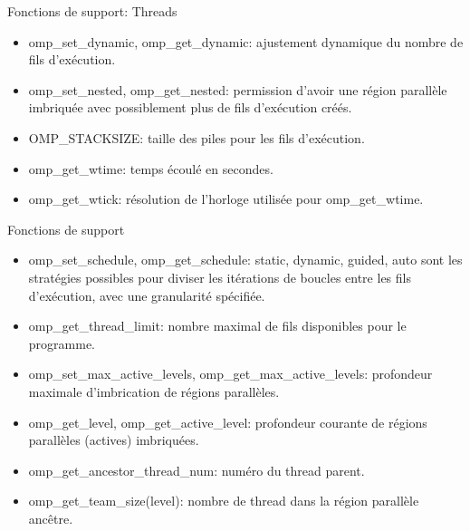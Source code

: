 \documentclass[10pt]{beamer}
\begin{document}
\begin{frame}[fragile]{Fonctions de support: Threads}

  \begin{itemize}
    \item omp\_set\_dynamic, omp\_get\_dynamic: ajustement dynamique du nombre de fils d'exécution. 

    \item omp\_set\_nested, omp\_get\_nested: permission d'avoir une région parallèle imbriquée avec possiblement plus de fils d'exécution créés.

    \item OMP\_STACKSIZE: taille des piles pour les fils d'exécution.

    \item omp\_get\_wtime: temps écoulé en secondes.

    \item omp\_get\_wtick: résolution de l'horloge utilisée pour omp\_get\_wtime.
  \end{itemize}
\end{frame}

\begin{frame}[fragile]{Fonctions de support}

  \begin{itemize}
    \item omp\_set\_schedule, omp\_get\_schedule: static, dynamic, guided, auto sont les stratégies possibles pour diviser les itérations de boucles entre les fils d'exécution, avec une granularité spécifiée.

    \item omp\_get\_thread\_limit: nombre maximal de fils disponibles pour le programme.

    \item omp\_set\_max\_active\_levels, omp\_get\_max\_active\_levels: profondeur maximale d'imbrication de régions parallèles.

    \item omp\_get\_level, omp\_get\_active\_level: profondeur courante de régions parallèles (actives) imbriquées.

    \item omp\_get\_ancestor\_thread\_num: numéro du thread parent. 

    \item omp\_get\_team\_size(level): nombre de thread dans la région parallèle ancêtre.
  \end{itemize}
\end{frame}
\end{document}
